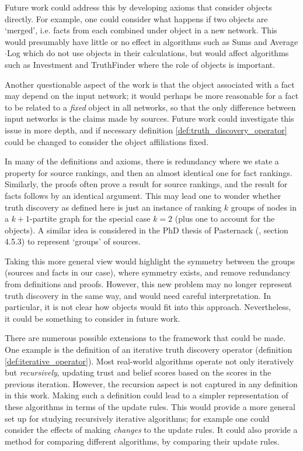 \documentclass[../main.tex]{subfiles}
\begin{document}
Future work could address this by developing axioms that consider objects
directly. For example, one could consider what happens if two objects are
`merged', i.e. facts from each combined under object in a new network. This
would presumably have little or no effect in algorithms such as Sums and
Average$\cdot$Log \cite{pasternack} which do not use objects in their
calculations, but would affect algorithms such as Investment \cite{pasternack}
and TruthFinder \cite{yin_han_yu} where the role of objects is
important.\footnotemark{}


Another questionable aspect of the work is that the object associated with a
fact may depend on the input network; it would perhaps be more reasonable for a
fact to be related to a \emph{fixed} object in all networks, so that the only
difference between input networks is the claims made by sources. Future work
could investigate this issue in more depth, and if necessary definition
\ref{def:truth_discovery_operator} could be changed to consider the object
affiliations fixed.

In many of the definitions and axioms, there is redundancy where we state a
property for source rankings, and then an almost identical one for fact
rankings. Similarly, the proofs often prove a result for source rankings, and
the result for facts follows by an identical argument. This may lead one to
wonder whether truth discovery as defined here is just an instance of ranking
$k$ groups of nodes in a $k + 1$-partite graph for the special case $k = 2$
(plus one to account for the objects). A similar idea is considered in the PhD
thesis of Pasternack (\cite{pasternack_thesis}, section 4.5.3) to represent
`groups' of sources.

Taking this more general view would highlight the symmetry between the groups
(sources and facts in our case), where symmetry exists, and remove redundancy
from definitions and proofs.  However, this new problem may no longer represent
truth discovery in the same way, and would need careful interpretation. In
particular, it is not clear how objects would fit into this approach.
Nevertheless, it could be something to consider in future work.

There are numerous possible extensions to the framework that could be made.
One example is the definition of an iterative truth discovery operator
(definition \ref{def:iterative_operator}). Most real-world algorithms operate
not only iteratively but \emph{recursively}, updating trust and belief scores
based on the scores in the previous iteration. However, the recursion aspect is
not captured in any definition in this work. Making such a definition could
lead to a simpler representation of these algorithms in terms of the update
rules. This would provide a more general set up for studying recursively
iterative algorithms; for example one could consider the effects of making
\emph{changes} to the update rules. It could also provide a method for
comparing different algorithms, by comparing their update rules.
\end{document}

